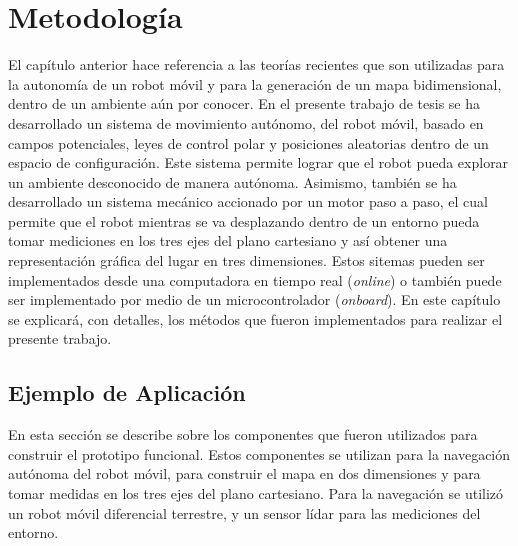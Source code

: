\chapter{Metodolog\'ia}

El capítulo anterior hace referencia a las teorías recientes que son
utilizadas para la autonomía de un robot móvil y para la generación de
un mapa bidimensional, dentro de un ambiente aún por conocer. En el presente
trabajo de tesis se ha desarrollado un sistema de movimiento 
autónomo, del robot móvil, basado en campos potenciales, leyes de control 
polar y posiciones aleatorias dentro de un espacio de configuración. Este sistema
permite lograr que el robot pueda explorar un ambiente desconocido de manera
autónoma. Asimismo, también se ha desarrollado un sistema mecánico accionado 
por un motor paso a paso, el cual permite que el robot mientras se va desplazando
dentro de un entorno pueda tomar mediciones en los tres ejes del plano
cartesiano y así obtener una representación gráfica del lugar en tres 
dimensiones. Estos sitemas pueden ser implementados desde una computadora en 
tiempo real (\textit{online}) o también puede ser implementado por medio de 
un microcontrolador (\textit{onboard}). En este capítulo se explicará, con 
detalles, los métodos que fueron implementados para realizar el presente trabajo.


\section{Ejemplo de Aplicación}
En esta sección se describe sobre los componentes que fueron utilizados para construir
el prototipo funcional. Estos componentes se utilizan para la navegación 
autónoma del robot móvil, para construir el mapa en dos dimensiones y para tomar medidas 
en los tres ejes del plano cartesiano. Para la navegación se utilizó un robot móvil 
diferencial terrestre, y un sensor lídar para las mediciones del entorno.

